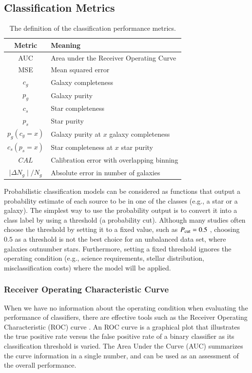 \documentclass[fleqn,usenatbib]{mnras}
\newcommand{\eg}{{e.g., }}
\begin{document}
\subsection{Classification Metrics}

\begin{table}
  \caption{The definition of the classification performance metrics.}
  \centering
  \begin{tabular}{c l}
  \hline
  Metric & Meaning \\
  \hline
  AUC & Area under the Receiver Operating Curve \\
  MSE & Mean squared error \\
  $c_g$ & Galaxy completeness \\
  $p_g$ & Galaxy purity \\
  $c_s$ & Star completeness \\
  $p_s$ & Star purity \\
  $p_g(c_g=x)$ & Galaxy purity at $x$ galaxy completeness \\
  $c_s(p_s=x)$ & Star completeness at $x$ star purity \\
  $CAL$ & Calibration error with overlapping binning \\
  $\mid\Delta N_g\mid / N_g$ & Absolute error in number of galaxies\\
  \hline
  \end{tabular}
  \label{table:metrics}
\end{table}

Probabilistic classification models can be considered as
functions that output a probability estimate of each source
to be in one of the classes (\eg a star or a galaxy).
The simplest way to use the probability output is to
convert it into a class label by using a threshold (a probability cut).
Although many studies often choose the threshold by setting it to a fixed value,
such as $P_{{\mathrm{cut}}} = 0.5$ \citep[\eg][]{henrion2011bayesian, Fadely2012},
choosing $0.5$ as a threshold is not the best choice
for an unbalanced data set, where galaxies outnumber stars.
Furthermore, setting a fixed threshold ignores the operating condition 
(\eg science requirements, stellar distribution, misclassification costs)
where the model will be applied.


\subsubsection{Receiver Operating Characteristic Curve}

When we have no information about the operating condition
when evaluating the performance of classifiers,
there are effective tools such as
the Receiver Operating Characteristic (ROC) curve
\citep*{swets2000better}.
An ROC curve is a graphical plot that illustrates the true positive rate
versus the false positive rate of a binary classifier
as its classification threshold is varied.
The Area Under the Curve (AUC) summarizes the curve information
in a single number,
and can be used as an assessment of the overall performance.
\end{document}

